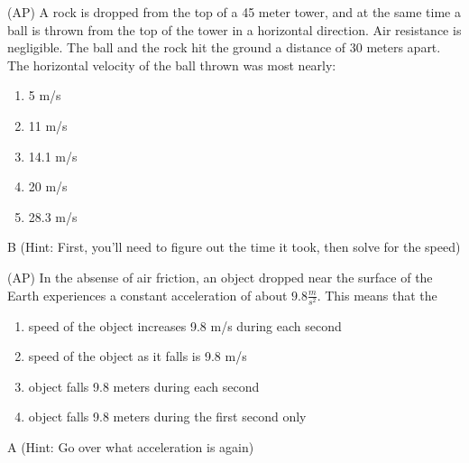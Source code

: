 \begin{question}
(AP) A rock is dropped from the top of a 45 meter tower, and at the same time a ball is thrown from the top of the tower in a horizontal direction. Air resistance is negligible. The ball and the rock hit the ground a distance of 30 meters apart. The horizontal velocity of the ball thrown was most nearly:
\begin{multicols}{5}
\begin{enumerate}[label=(\alph*)]
    \item 5 m/s
    \item 11 m/s
    \item 14.1 m/s
    \item 20 m/s
    \item 28.3 m/s
\end{enumerate}
\end{multicols}
\end{question}

\begin{solution}
B (Hint: First, you'll need to figure out the time it took, then solve for the speed)
\end{solution}


\begin{question}
(AP) In the absense of air friction, an object dropped near the surface of the Earth experiences a constant acceleration of about $9.8\frac{m}{s^2}$. This means that the
\begin{enumerate}[label=(\alph*)]
    \item speed of the object increases 9.8 m/s during each second
    \item speed of the object as it falls is 9.8 m/s
    \item object falls 9.8 meters during each second
    \item object falls 9.8 meters during the first second only
\end{enumerate}

\end{question}

\begin{solution}
A (Hint: Go over what acceleration is again)
\end{solution}



